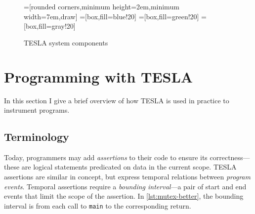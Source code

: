 \begin{figure}
  =[rounded corners,minimum height=2em,minimum width=7em,draw]
  =[box,fill=blue!20]
  =[box,fill=green!20]
  =[box,fill=gray!20]

  \caption{TESLA system components}
  \label{fig:components}
\end{figure}

\section{Programming with TESLA}

In this section I give a brief overview of how TESLA is used in practice
to instrument programs.

\subsection{Terminology} \label{sec:terminology}

Today, programmers may add \emph{assertions} to their code to ensure its
correctness---these are logical statements predicated on data in the current
scope. TESLA assertions are similar in concept, but express temporal relations
between \emph{program events}. Temporal assertions require a \emph{bounding
interval}---a pair of start and end events that limit the scope of the
assertion. In \autoref{lst:mutex-better}, the bounding interval is from each
call to \texttt{main} to the corresponding return.

